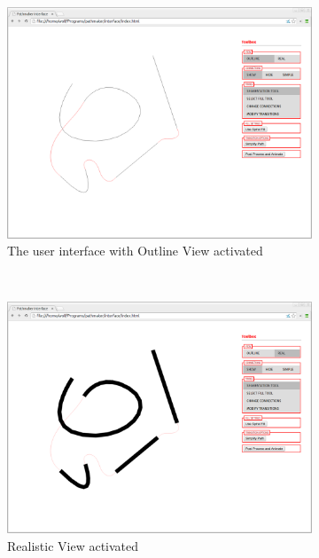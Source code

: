 \begin{figure}

\begin{subfigure}[t]{0.45\textwidth}
\includegraphics[width=\textwidth]{images/ui/i1.png}
\caption{The user interface with Outline View activated}\label{fig:outline_view}
\end{subfigure}~
\begin{subfigure}[t]{0.45\textwidth}
\includegraphics[width=\textwidth]{images/ui/i2.png}
\caption{Realistic View activated}\label{fig:real_view}
\end{subfigure}\par \bigskip
\begin{subfigure}[t]{0.45\textwidth}

\end{subfigure}
\end{figure}
